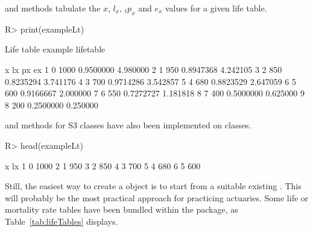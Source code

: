\documentclass[nojss]{jss}
\begin{document}
 and   methods tabulate 
the $x$, $l_x$, ${}_{t}p_{x}$ and $e_x$ values for a given life table.


\begin{Schunk}
\begin{Sinput}
R> print(exampleLt)
\end{Sinput}
\begin{Soutput}
Life table example lifetable 

  x   lx        px       ex
1 0 1000 0.9500000 4.980000
2 1  950 0.8947368 4.242105
3 2  850 0.8235294 3.741176
4 3  700 0.9714286 3.542857
5 4  680 0.8823529 2.647059
6 5  600 0.9166667 2.000000
7 6  550 0.7272727 1.181818
8 7  400 0.5000000 0.625000
9 8  200 0.2500000 0.250000
\end{Soutput}
\end{Schunk}

 and  methods for  S3 classes have also 
been implemented on  classes.

\begin{Schunk}
\begin{Sinput}
R> head(exampleLt)
\end{Sinput}
\begin{Soutput}
  x   lx
1 0 1000
2 1  950
3 2  850
4 3  700
5 4  680
6 5  600
\end{Soutput}
\end{Schunk}

Still, the easiest way to create a  object is to start 
from a suitable existing . This will probably be the most
practical approach for practicing actuaries. Some life or mortality rate
tables have been bundled within the  package, as
Table~\ref{tab:lifeTables} displays.
\end{document}
